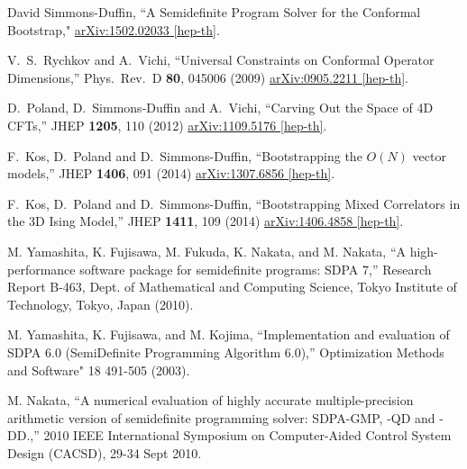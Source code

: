 \documentclass[12pt]{article}
\numberwithin{equation}{section}
\begin{document}
\begin{thebibliography}{9}

  David Simmons-Duffin,
  ``A Semidefinite Program Solver for the Conformal Bootstrap,"
  \href{http://arxiv.org/abs/1502.02033}{arXiv:1502.02033 [hep-th]}.

  V.~S.~Rychkov and A.~Vichi,
  ``Universal Constraints on Conformal Operator Dimensions,''
  Phys.\ Rev.\ D {\bf 80}, 045006 (2009)
  \href{http://arxiv.org/abs/0905.2211}{arXiv:0905.2211 [hep-th]}.

  D.~Poland, D.~Simmons-Duffin and A.~Vichi,
  ``Carving Out the Space of 4D CFTs,''
  JHEP {\bf 1205}, 110 (2012)
  \href{http://arXiv.org/abs/1109.5176}{arXiv:1109.5176 [hep-th]}.
  
  F.~Kos, D.~Poland and D.~Simmons-Duffin,
  ``Bootstrapping the $O(N)$ vector models,''
  JHEP {\bf 1406}, 091 (2014)
  \href{http://arXiv.org/abs/1307.6856}{arXiv:1307.6856 [hep-th]}.

  F.~Kos, D.~Poland and D.~Simmons-Duffin,
  ``Bootstrapping Mixed Correlators in the 3D Ising Model,''
  JHEP {\bf 1411}, 109 (2014)
  \href{http://arXiv.org/abs/1406.4858}{arXiv:1406.4858 [hep-th]}.

  M. Yamashita, K. Fujisawa, M. Fukuda, K. Nakata, and M. Nakata,
  ``A high-performance software package for semidefinite programs: SDPA 7,''
   Research Report B-463, Dept. of Mathematical and Computing Science, Tokyo Institute of Technology, Tokyo, Japan (2010).

  M. Yamashita, K. Fujisawa, and M. Kojima,
  ``Implementation and evaluation of SDPA 6.0 (SemiDefinite Programming Algorithm 6.0),''
  Optimization Methods and Software" 18 491-505 (2003).

  M. Nakata,
  ``A numerical evaluation of highly accurate multiple-precision arithmetic version of semidefinite programming solver: SDPA-GMP, -QD and -DD.,''
  2010 IEEE International Symposium on Computer-Aided Control System Design (CACSD), 29-34 Sept 2010.


\end{thebibliography}
\end{document}
